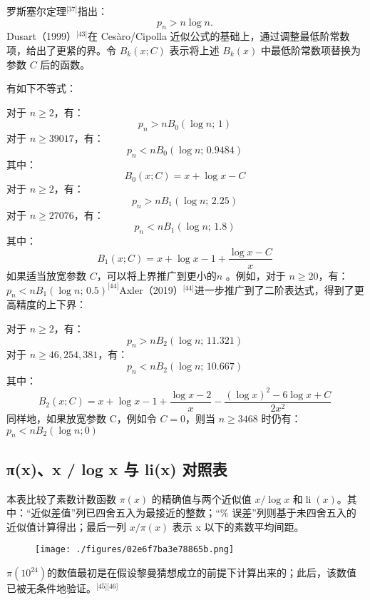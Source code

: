 罗斯塞尔定理\(^\text{[37]}\)指出：
$$
p_n > n \log n.~
$$
Dusart（1999）\(^\text{[43]}\)在 Cesàro/Cipolla 近似公式的基础上，通过调整最低阶常数项，给出了更紧的界。令 $B_k(x; C)$ 表示将上述 $B_k(x)$ 中最低阶常数项替换为参数 $C$ 后的函数。

有如下不等式：

对于 $n \geq 2$，有：
$$
p_n > n B_0(\log n;\, 1)~
$$
对于 $n \geq 39017$，有：
$$
p_n < n B_0(\log n;\, 0.9484)~
$$
其中：
$$
B_0(x; C) = x + \log x - C~
$$
对于 $n \geq 2$，有：
$$
p_n > n B_1(\log n;\, 2.25)~
$$
对于 $n \geq 27076$，有：
$$
p_n < n B_1(\log n;\, 1.8)~
$$
其中：
$$
B_1(x; C) = x + \log x - 1 + \frac{\log x - C}{x}~
$$
如果适当放宽参数 $C$，可以将上界推广到更小的$n$ 。例如，对于 $n \geq 20$，有：$p_n < n B_1(\log n;\, 0.5)^\text{[44]}$Axler（2019）\(^\text{[44]}\)进一步推广到了二阶表达式，得到了更高精度的上下界：

对于 \( n \geq 2 \)，有：
$$
p_n > n B_2(\log n;\, 11.321)~
$$
对于 $n \geq 46,\!254,\!381$，有：
$$
p_n < n B_2(\log n;\, 10.667)~
$$
其中：
$$
B_2(x; C) = x + \log x - 1 + \frac{\log x - 2}{x} - \frac{(\log x)^2 - 6 \log x + C}{2 x^2}~
$$
同样地，如果放宽参数 C，例如令 $C = 0$，则当 $n \geq 3468$ 时仍有：$p_n < n B_2(\log n; 0)$
\subsection{π(x)、x / log x 与 li(x) 对照表}
本表比较了素数计数函数 $\pi(x)$ 的精确值与两个近似值 $x/\log x$ 和$\operatorname{li}(x)$。其中：“近似差值”列已四舍五入为最接近的整数；“\% 误差”列则基于未四舍五入的近似值计算得出；最后一列 $x/\pi(x)$ 表示 x 以下的素数平均间距。
\begin{figure}[ht]
\centering
\texttt{[image: ./figures/02e6f7ba3e78865b.png]}
\caption{} \label{fig_SDL_5}
\end{figure}
$\pi(10^{24})$的数值最初是在假设黎曼猜想成立的前提下计算出来的；此后，该数值已被无条件地验证。\(^\text{[45][46]}\)
